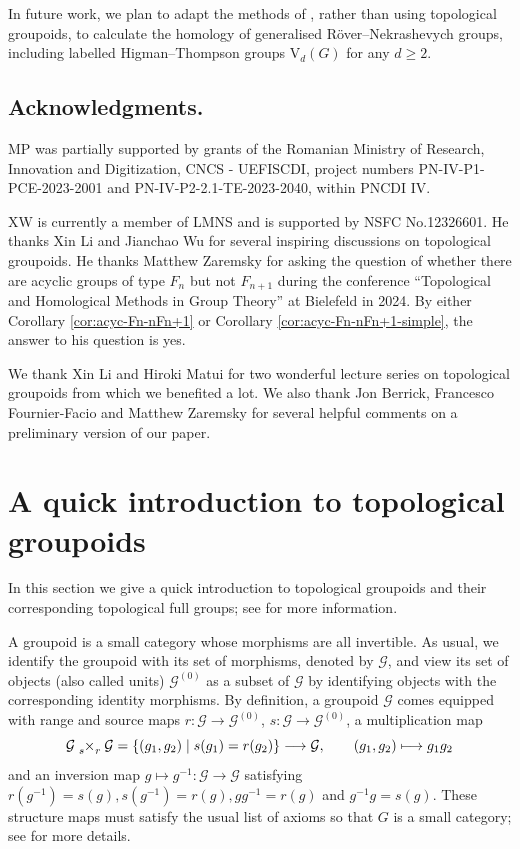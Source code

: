 \documentclass[10pt,a4paper]{amsart}
\numberwithin{equation}{section}
\numberwithin{figure}{section}
\theoremstyle{definition}
\newcommand{\cG}{\mathcal{G}}
\newcommand{\V}{\mathrm{V}}
\renewcommand{\geq}{\geqslant}
\begin{document}
In future work, we plan to adapt the methods of \cite{SW19}, rather than using topological groupoids, to calculate the homology of generalised Röver--Nekrashevych groups, including labelled Higman--Thompson groups $\V_d(G)$ for any $d\geq 2$.


\subsection*{Acknowledgments.}
MP was partially supported by grants of the Romanian Ministry of Research, Innovation and Digitization, CNCS - UEFISCDI, project numbers PN-IV-P1-PCE-2023-2001 and PN-IV-P2-2.1-TE-2023-2040, within PNCDI IV.

XW is currently a member of LMNS and is supported by NSFC No.12326601. He thanks Xin Li and Jianchao Wu for several inspiring discussions on topological groupoids. He thanks Matthew Zaremsky for asking the question of whether there are acyclic groups of type $F_n$ but not $F_{n+1}$ during the conference ``Topological and Homological Methods in Group Theory'' at Bielefeld in 2024. By either Corollary \ref{cor:acyc-Fn-nFn+1} or Corollary \ref{cor:acyc-Fn-nFn+1-simple}, the answer to his question is yes.

We thank Xin Li and Hiroki Matui for two wonderful lecture series on topological groupoids from which we benefited a lot. We also thank Jon Berrick, Francesco Fournier-Facio and Matthew Zaremsky for several helpful comments on a preliminary version of our paper.


\section{A quick introduction to topological groupoids}
\label{section:top-groupoids}

In this section we give a quick introduction to topological groupoids and their corresponding topological full groups; see \cite{Matui15,Renault80} for more information.

A groupoid is a small category whose morphisms are all invertible. As usual, we identify the groupoid with its set of morphisms, denoted by $\mathcal{G}$, and view its set of objects (also called units) $\mathcal{G}^{(0)}$ as a subset of $\mathcal{G}$ by identifying objects with the corresponding identity morphisms. By definition, a groupoid $\mathcal{G}$ comes equipped with range and source maps $r \colon \mathcal{G} \to \mathcal{G}^{(0)}$, $s \colon \mathcal{G} \to \mathcal{G}^{(0)}$, a multiplication map
\[
\mathcal{G} \tensor[_s]{\times}{_r} \mathcal{G} = \{ (g_1,g_2)\mid s(g_1) = r(g_2)\} \longrightarrow \mathcal{G}, \qquad (g_1,g_2) \longmapsto g_1g_2
\]
and an inversion map $g \mapsto g^{-1} \colon \cG \to \cG$ satisfying $r(g^{-1}) = s(g), s(g^{-1}) =r(g), gg^{-1} = r(g)$ and $g^{-1} g = s(g)$. These structure maps must satisfy the usual list of axioms so that $G$ is a small category; see \cite[Section 1.1]{Renault80} for more details.
\end{document}
